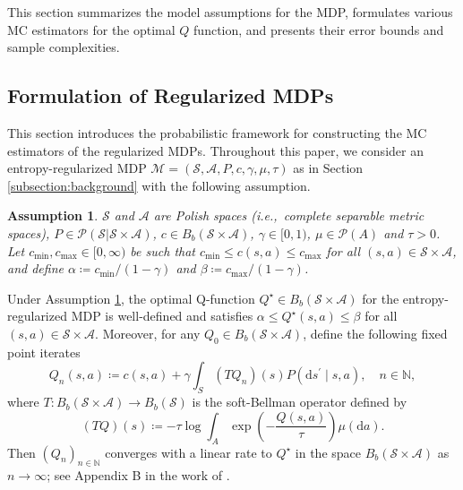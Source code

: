 \documentclass[11pt]{article}
\numberwithin{equation}{section}
\newtheorem{assumption}{Assumption}
\theoremstyle{definition}
\theoremstyle{remark}
\def\cA{\mathcal{A}}
\def\cP{\mathcal{P}}
\def\cS{\mathcal{S}}
\def\diff{{\mathrm{d}}}
\def\d{{\mathrm{d}}}
\def\N{{\mathbb{N}}}
\newcommand{\citet}{\cite}
\begin{document}
This section summarizes 
 the model assumptions for  the  MDP, formulates various  MC estimators for the optimal 
$Q$ function, and presents their error bounds and sample complexities.
 

\subsection{Formulation of  Regularized MDPs}
\label{subsection:assumptions}

This section introduces the probabilistic framework for constructing the MC estimators of the regularized MDPs. 
Throughout this paper, 
we 
consider  an entropy-regularized MDP 
  $\mathcal M = (\mathcal S, \mathcal A, P, c, \gamma, \mu, \tau)$   as   in Section \ref{subsection:background}
  with the following assumption.
  
\begin{assumption}
    \label{assumption:data}
    $\mathcal S$ and $  \mathcal A$ are Polish spaces (i.e.,\   complete separable metric spaces),
    $P\in \cP(\cS|\cS\times \cA)$,
    $c\in B_b(\cS\times \cA)$,
    $\gamma\in [0,1)$,
    $\mu\in \cP(A)$
    and $\tau>0$.
Let
     $c_{\min}, c_{\max}\in [0,\infty)$ be such that $   c_{\min} \leq c(s,a) \leq c_{\max}$ for all $(s,a ) \in \mathcal S\times  \mathcal A$,
     and define 
      $\alpha \coloneqq c_{\min}/(1-\gamma) $
      and $\beta \coloneqq c_{\max}/(1-\gamma)$.
     
\end{assumption}

 Under Assumption \ref{assumption:data},  the optimal Q-function 
$Q^\star\in B_b(\cS\times \cA)   $ for the entropy-regularized MDP 
is    well-defined   and satisfies 
$ \alpha \leq Q^\star(s,a) \leq \beta
$
for all $(s,a)\in \cS\times \cA$.
Moreover, 
for any $Q_0\in B_b(\cS\times \cA)$,
define 
the following fixed point iterates 
 \begin{equation}
 \label{eq:fixed_point}
 Q_n(s,a)\coloneqq c(s,a)+\gamma \int_{S}
    (T Q_n)(s)  P(\diff s ^{\prime} \mid s,a), \quad n\in \N,
 \end{equation}
where 
$T:B_b(\cS\times \cA)\to B_b(\cS)$
is the soft-Bellman operator defined by
 \begin{equation}
 \label{eq:soft_bellman}
   (TQ)(s)\coloneqq -\tau\log \int_{A} \exp\left(- \frac{Q(s,a)}{\tau}\right) \mu(\d a).
\end{equation}
Then
$(Q_n)_{n\in \N}$ 
converges with a linear rate to $Q^\star$ in the space $B_b(\cS\times \cA)$ as $n\to \infty$; see Appendix B in the work of \citet{kerimkulov2023fisherrao}.
\end{document}
